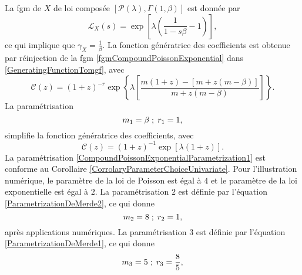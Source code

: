La \gls{fgm} de $X$ de loi composée $\left[\mathcal{P}(\lambda),\Gamma(1,\beta)\right]$ est donnée par 
\begin{equation}\label{fgmCompoundPoissonExponential}
\mathcal{L}_{X}(s)=\exp\left[\lambda\left(\frac{1}{1-s\beta}-1\right)\right],
\end{equation}
ce qui implique que $\gamma_{X}=\frac{1}{\beta}$. La fonction génératrice des coefficients est obtenue par réinjection de la \gls{fgm} \eqref{fgmCompoundPoissonExponential} dans \eqref{GeneratingFunctionTomgf}, avec
\begin{equation}\label{CoeficientGeneratingFunctionCompoundPoissonExponential}
\mathcal{C}(z)=(1+z)^{-r}\exp\left\{\lambda\left[\frac{m(1+z)-\left[m+z(m-\beta)\right]}{m+z(m-\beta)}\right]\right\}.
\end{equation}
La paramétrisation
\begin{equation}\label{CompoundPoissonExponentialParametrization1}
m_{1}=\beta\hspace{0.1cm};\hspace{0.1cm}r_{1}=1,
\end{equation}
simplifie la fonction génératrice des coefficients, avec 
\begin{equation*}
\mathcal{C}(z)=(1+z)^{-1}\exp\left[\lambda(1+z)\right].
\end{equation*}
La paramétrisation \eqref{CompoundPoissonExponentialParametrization1} est conforme au Corollaire \ref{CorrolaryParameterChoiceUnivariate}. Pour l\rq{}illustration numérique, le paramètre de la loi de Poisson est égal à $4$ et le paramètre de la loi exponentielle est égal à $2$. La paramétrisation $2$ est définie par l\rq{}équation \eqref{ParametrizationDeMerde2}, ce qui donne  
\begin{equation*}
m_{2}=8\hspace{0.1cm};\hspace{0.1cm}r_{2}=1,
\end{equation*}
après applications numériques. La paramétrisation $3$ est définie par l\rq{}équation \eqref{ParametrizationDeMerde1}, ce qui donne  
\begin{equation*}
m_{3}=5\hspace{0.1cm};\hspace{0.1cm}r_{3}=\frac{8}{5},
\end{equation*}
